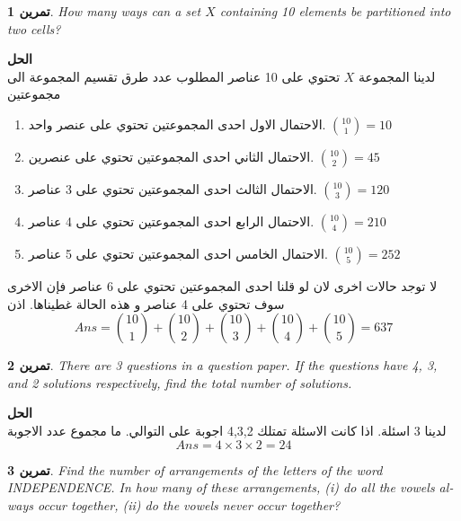 \documentclass[14pt, a4paper, leqno]{extarticle}
\newcommand{\en}{\textenglish}
\theoremstyle{theoremstyle}
\newtheorem{example}{تمرين}
\newenvironment{solution}{\noindent\textbf{الحل}\vspace{3pt}\\}{}
\begin{document}
	\begin{example}
		\en{How many ways can a set \(X\) containing 10 elements be partitioned into two cells?}
	\end{example}
	
	\begin{solution}
		لدينا المجموعة \(X\) تحتوي على 10 عناصر المطلوب عدد طرق تقسيم المجموعة الى مجموعتين
        \begin{enumerate}
			\item الاحتمال الاول احدى المجموعتين تحتوي على عنصر واحد. \(\binom{10}{1}=10\)
			\item الاحتمال الثاني احدى المجموعتين تحتوي على عنصرين. \(\binom{10}{2}=45\)
			\item الاحتمال الثالث احدى المجموعتين تحتوي على  3 عناصر. \(\binom{10}{3}=120\)
			\item الاحتمال الرابع احدى المجموعتين تحتوي على  4 عناصر. \(\binom{10}{4}=210\)
			\item الاحتمال الخامس احدى المجموعتين تحتوي على  5 عناصر. \(\binom{10}{5}=252\)
		\end{enumerate}
		لا توجد حالات اخرى لان لو قلنا احدى المجموعتين تحتوي على 6 عناصر فإن الاخرى سوف تحتوي على 4 عناصر و هذه الحالة غطيناها. اذن
		\[
		\textit{Ans} = \binom{10}{1} + \binom{10}{2} + \binom{10}{3} + \binom{10}{4} + \binom{10}{5} = 637
		\]
	\end{solution}
	
	\begin{example}
		\en{There are 3 questions in a question paper. If the questions have 4, 3, and 2 solutions respectively, find the total number of solutions.}
	\end{example}
	
	\begin{solution}
		لدينا 3 اسئلة. اذا كانت الاسئلة تمتلك 4,3,2 اجوبة على التوالي. ما مجموع عدد الاجوبة
		\[
		\textit{Ans} = 4\times 3 \times 2 = 24
		\]
	\end{solution}
	
	\begin{example}
		\en{Find the number of arrangements of the letters of the word \\INDEPENDENCE. In how many of these arrangements, (i) do all the vowels always occur together, (ii) do the vowels never occur together?}
	\end{example}
	
\end{document}
